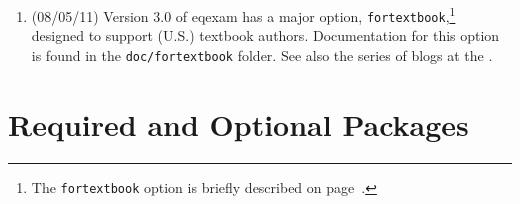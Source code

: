 \documentclass{article}
\begin{document}
\begin{enumerate}
    \item (08/05/11) Version 3.0 of \textsf{eqexam} has a major option,
        \texttt{fortextbook},\footnote{The \texttt{fortextbook} option is briefly
        described on page~\pageref*{fortextbook}.} designed to support (U.S.)
        textbook authors. Documentation for this option is found in the
        \texttt{doc/fortextbook} folder. See also the series of blogs at the
        .

\end{enumerate}

%
%
%
%
%
%

\section{Required and Optional Packages}
\end{document}
